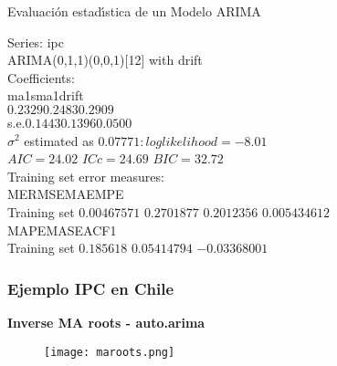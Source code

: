 \documentclass[spanish,xcolor=table]{beamer}
\begin{document}
\begin{section}{Evaluaci\'on estad\'{\i}stica de un Modelo ARIMA}
\begin{frame}
Series: ipc \\
ARIMA(0,1,1)(0,0,1)[12] with drift \\
 \vspace{2mm}	
Coefficients:\\
\hspace{5em}ma1\hspace{3em}sma1\hspace{3em}drift\\
\hspace{5em}$0.2329$\hspace{2em}$0.2483$\hspace{2em}$0.2909$\\
s.e.\hspace{3.5em}$0.1443$\hspace{2em}$0.1396$\hspace{2em}$0.0500$\\
 \vspace{2mm}	
$\sigma^2$ estimated as $0.07771:  log likelihood=-8.01$\\
$AIC=24.02$  $ ICc=24.69$  $BIC=32.72$\\
 \vspace{2mm}	
Training set error measures:\\
\hspace{7em}ME\hspace{2em}RMSE\hspace{3em}MAE\hspace{2em}MPE\\
Training set $0.00467571$ $0.2701877$ $0.2012356$ $0.005434612$\\
\hspace{7em}MAPE\hspace{2em}MASE\hspace{2em}ACF1\\
Training set $0.185618$ $0.05414794$ $-0.03368001$\\

\end{frame}

\begin{frame}
\frametitle{Ejemplo IPC en Chile}
\textbf{Inverse MA roots  - auto.arima}\\
 \vspace{4mm}	
\begin{figure}[t!]
\texttt{[image: maroots.png]}
\end{figure}
 

\end{frame}
\end{section}
\end{document}
